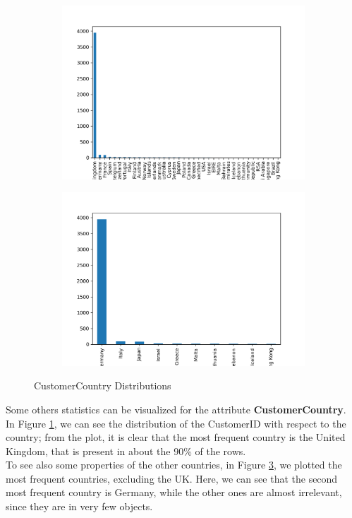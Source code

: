 \begin{figure}[!h]
\begin{subfigure}{.5\textwidth}
\centering
\includegraphics[width=.93\textwidth]{img/country_bar.png}
\caption{}
\label{fig:country_bar}
\end{subfigure}
\begin{subfigure}{.5\textwidth}
\centering
\includegraphics[width=.93\textwidth]{img/part_country_bar.png}
\caption{}
\label{fig:part_country_bar}
\end{subfigure}
\caption{CustomerCountry Distributions}
\end{figure}

Some others statistics can be visualized for the attribute \textbf{CustomerCountry}.\\
In Figure \ref{fig:country_bar}, we can see the distribution of the CustomerID with respect to the country; from the plot, it is clear that the most frequent country is the United Kingdom, that is present in about the 90\% of the rows.\\
To see also some properties of the other countries, in Figure \ref{fig:part_country_bar}, we plotted the most frequent countries, excluding the UK. Here, we can see that the second most frequent country is Germany, while the other ones are almost irrelevant, since they are in very few objects.

